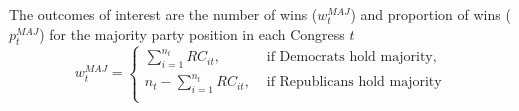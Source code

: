 %
%
%
%
%
%
%
%



\noindent The outcomes of interest are the number of wins ($w_t^{MAJ}$) and proportion of wins ($p_t^{MAJ}$) for the majority party position in each Congress $t$
%
\begin{equation*}
w_t^{MAJ} =
\begin{cases} \sum_{i=1}^{n_t} RC_{it}, & \text{ if Democrats hold majority}, \\
n_t - \sum_{i=1}^{n_t} RC_{it}, & \text{ if Republicans hold majority} \\
\end{cases}
\end{equation*}
 

